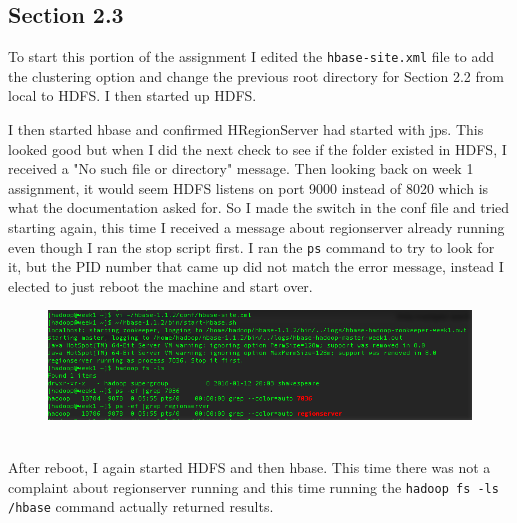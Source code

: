 \documentclass[10pt]{article}
\begin{document}
\subsection*{Section 2.3}
To start this portion of the assignment I edited the \verb|hbase-site.xml| file to add the clustering option and change the previous root directory for Section 2.2 from local to HDFS. I then started up HDFS.
\par
{}%
\hfill
{}%
\par
I then started hbase and confirmed HRegionServer had started with jps. This looked good but when I did the next check to see if the folder existed in HDFS, I received a "No such file or directory" message. Then looking back on week 1 assignment, it would seem HDFS listens on port 9000 instead of 8020 which is what the documentation asked for. So I made the switch in the conf file and tried starting again, this time I received a message about regionserver already running even though I ran the stop script first. I ran the \verb|ps| command to try to look for it, but the PID number that came up did not match the error message, instead I elected to just reboot the machine and start over.
\begin{figure}[!h]
\includegraphics[scale=0.37]{region_running.png}
\centering
\end{figure}\\
\indent After reboot, I again started HDFS and then hbase. This time there was not a complaint about regionserver running and this time running the \verb|hadoop fs -ls /hbase| command actually returned results.
\end{document}
